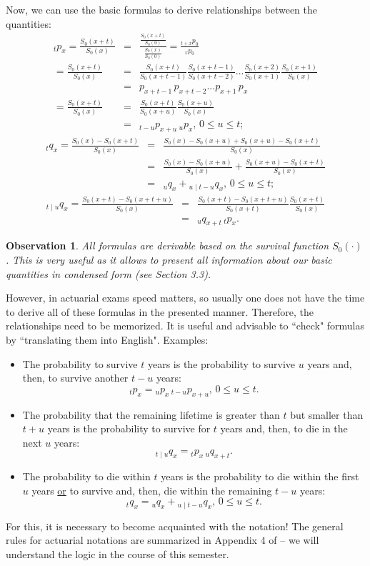 \documentclass[11pt,fleqn,oneside]{book}
\newtheorem{observation}{Observation}
\begin{document}
Now, we can use the basic formulas to derive relationships between the quantities:
\begin{eqnarray*}
{_tp_x} = \frac{S_0(x+t)}{S_0(x)} &=& \frac{\frac{S_0(x+t)}{S_0(0)}}{\frac{S_0(x)}{S_0(0)}} = \frac{{_{t+x}p_0}}{{_xp_0}}\\
	= \frac{S_0(x+t)}{S_0(x)} &=& \frac{S_0(x+t)}{S_0(x+t-1)} \frac{S_0(x+t-1)}{S_0(x+t-2)} ... \frac{S_0(x+2)}{S_0(x+1)} \frac{S_0(x+1)}{S_0(x)}\\
	&=& {p_{x+t-1}}\, {p_{x+t-2}}... {p_{x+1}}\, {p_{x}}\\
	= \frac{S_0(x+t)}{S_0(x)} &=& \frac{S_0(x+t)}{S_0(x+u)}\frac{S_0(x+u)}{S_0(x)}\\ 
	&=& {_{t-u}p_{x+u}}\,{_up_x},\,0\leq u \leq t; 
\end{eqnarray*}
\begin{eqnarray*}
{_tq_x} = \frac{S_0(x) - S_0(x+t)}{S_0(x)} &=& 	\frac{S_0(x) -S_0(x+u) + S_0(x+u)- S_0(x+t)}{S_0(x)} \\
&=&\frac{S_0(x) -S_0(x+u) }{S_0(x)} + \frac{ S_0(x+u)- S_0(x+t)}{S_0(x)} \\
&=& {_uq_x} + {_{u \mid t-u}q_x},\,0\leq u \leq t; 
\end{eqnarray*}
\begin{eqnarray*}
{_{t \mid u}q_x} = \frac{ S_0(x+t)- S_0(x+t+u)}{S_0(x)} &=& \frac{ S_0(x+t)- S_0(x+t+u)}{S_0(x+t)}\frac{ S_0(x+t)}{S_0(x)} \\
&=&  {_uq_{x+t}}\,{_tp_x}. 
\end{eqnarray*}

\begin{observation}
\label{OBSSX}
All formulas are derivable based on the survival function $S_0(\cdot)$. This is very useful as it allows to present all information about our basic quantities in condensed form (see Section 3.3).%
\end{observation}
However, in actuarial exams speed matters, so usually one does not have the time to derive all of these formulas in the presented manner. Therefore, the relationships need to be memorized. It is useful and advisable to ``check" formulas by ``translating them into English". Examples:
\begin{itemize}
\item The probability to survive $t$ years is the probability to survive $u$ years and, then, to survive another $t-u$ years:
$$
{_tp_x} = {_up_x}\, {_{t-u}p_{x+u}},\,0\leq u \leq t.
$$
\item The probability that the remaining lifetime is greater than $t$ but smaller than $t+u$ years is the probability to survive for $t$ years and, then, to die in the next $u$ years:
$$
{_{t \mid u}q_x} = {_tp_x}\, {_uq_{x+t}}.
$$
\item The probability to die within $t$ years is the probability to die within the first $u$ years \underline{or} to survive and, then, die within the remaining $t-u$ years:
$$
{_tq_x} =  {_uq_x} + {_{u \mid t-u}q_x},\,0\leq u \leq t.
$$
\end{itemize}
For this, it is necessary to become acquainted with the notation! The general rules for actuarial notations are summarized in Appendix 4 of \cite{BOWERS} -- we will understand the logic in the course of this semester.
\end{document}
